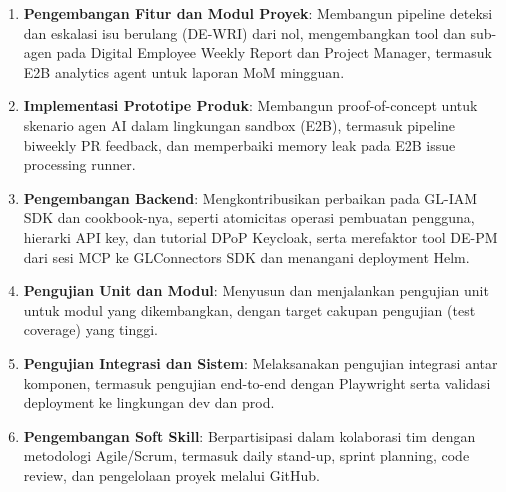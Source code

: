 \begin{enumerate}
    \item \textbf{Pengembangan Fitur dan Modul Proyek}: Membangun pipeline deteksi dan eskalasi isu berulang (DE-WRI) dari nol, mengembangkan tool dan sub-agen pada Digital Employee Weekly Report dan Project Manager, termasuk E2B analytics agent untuk laporan MoM mingguan.
    \item \textbf{Implementasi Prototipe Produk}: Membangun proof-of-concept untuk skenario agen AI dalam lingkungan sandbox (E2B), termasuk pipeline biweekly PR feedback, dan memperbaiki memory leak pada E2B issue processing runner.
    \item \textbf{Pengembangan Backend}: Mengkontribusikan perbaikan pada GL-IAM SDK dan cookbook-nya, seperti atomicitas operasi pembuatan pengguna, hierarki API key, dan tutorial DPoP Keycloak, serta merefaktor tool DE-PM dari sesi MCP ke GLConnectors SDK dan menangani deployment Helm.
    \item \textbf{Pengujian Unit dan Modul}: Menyusun dan menjalankan pengujian unit untuk modul yang dikembangkan, dengan target cakupan pengujian (test coverage) yang tinggi.
    \item \textbf{Pengujian Integrasi dan Sistem}: Melaksanakan pengujian integrasi antar komponen, termasuk pengujian end-to-end dengan Playwright serta validasi deployment ke lingkungan dev dan prod.
    \item \textbf{Pengembangan Soft Skill}: Berpartisipasi dalam kolaborasi tim dengan metodologi Agile/Scrum, termasuk daily stand-up, sprint planning, code review, dan pengelolaan proyek melalui GitHub.
\end{enumerate}

\newpage
